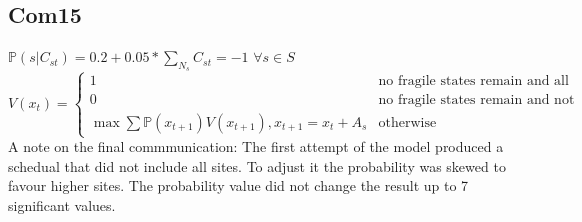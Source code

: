 \documentclass{article}
\begin{document}
	\subsection*{Com15}
	$\mathds{P}(s | C_{st}) = 0.2 + 0.05 * \sum_{N_s} C_{st} = -1$ $\forall s\in S$\\
	\begin{equation*}
		V(x_t) = \begin{cases}
			1 & \text{no fragile states remain and all required species are saved}\\
			0 & \text{no fragile states remain and not all required species are saved}\\
			\max{} \sum \mathds{P}(x_{t+1})V(x_{t+1}), x_{t+1} = x_t + A_s & \text{otherwise}
		\end{cases}
	\end{equation*}
	A note on the final commmunication: The first attempt of the model produced a schedual that did not 
	include all sites. To adjust it the probability was skewed to favour higher sites. The probability value did
	not change the result up to 7 significant values.

	\newpage
\end{document}
